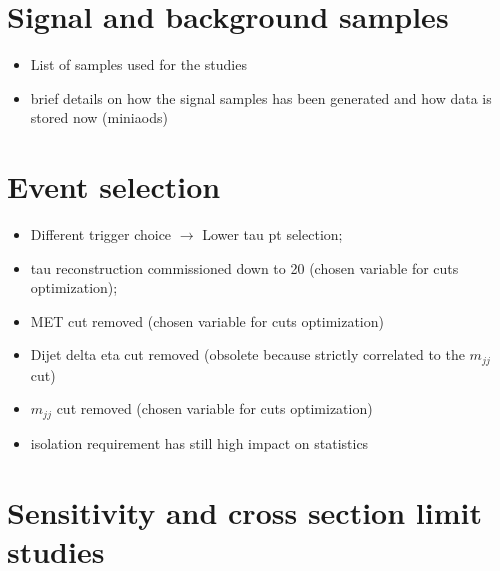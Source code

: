 

\section{Signal and background samples}

\begin{itemize}
	\item List of samples used for the studies
	\item brief details on how the signal samples has been generated and how data is stored now (miniaods)
\end{itemize}

\section{Event selection}

\begin{itemize}
	\item Different trigger choice $\rightarrow$  Lower tau pt selection;
	\item tau reconstruction commissioned down to 20 \gev (chosen variable for cuts optimization);
	\item MET cut removed (chosen variable for cuts optimization)
	\item Dijet delta eta cut removed (obsolete because strictly correlated to the $m_{jj}$ cut) 
	\item $m_{jj}$ cut removed (chosen variable for cuts optimization)
	\item \hadtau isolation requirement has still high impact on statistics
\end{itemize}

\section{Sensitivity and cross section limit studies}

